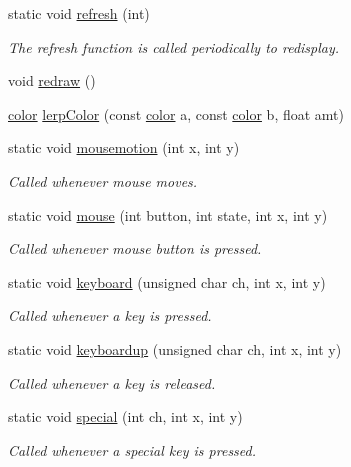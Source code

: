\begin{DoxyCompactItemize}
\item 
static void \hyperlink{namespacecprocessing_a4edceb61c45d6bf384a38826469a5a48}{refresh} (int)
\begin{DoxyCompactList}\small\item\em \-The refresh function is called periodically to redisplay. \end{DoxyCompactList}\item 
void \hyperlink{namespacecprocessing_aefce387a356aa3e4937d4e08fc1b0b4c}{redraw} ()
\item 
\hyperlink{classcprocessing_1_1color}{color} \hyperlink{namespacecprocessing_a4deeb570d9a3cb7321300200161ab054}{lerp\-Color} (const \hyperlink{classcprocessing_1_1color}{color} a, const \hyperlink{classcprocessing_1_1color}{color} b, float amt)
\item 
static void \hyperlink{namespacecprocessing_a9fc04981955baab92e7b528b6a0c7c34}{mousemotion} (int x, int y)
\begin{DoxyCompactList}\small\item\em \-Called whenever mouse moves. \end{DoxyCompactList}\item 
static void \hyperlink{namespacecprocessing_abac12fcdd0efbbd1491a14011c381241}{mouse} (int button, int state, int x, int y)
\begin{DoxyCompactList}\small\item\em \-Called whenever mouse button is pressed. \end{DoxyCompactList}\item 
static void \hyperlink{namespacecprocessing_ae6eaa821ce4703a70ab13b0420bf2573}{keyboard} (unsigned char ch, int x, int y)
\begin{DoxyCompactList}\small\item\em \-Called whenever a key is pressed. \end{DoxyCompactList}\item 
static void \hyperlink{namespacecprocessing_ae4039b15e3caa11e48cb8d63e0f08977}{keyboardup} (unsigned char ch, int x, int y)
\begin{DoxyCompactList}\small\item\em \-Called whenever a key is released. \end{DoxyCompactList}\item 
static void \hyperlink{namespacecprocessing_a1b66644ad17ec9a36ff2b304d55f4b27}{special} (int ch, int x, int y)
\begin{DoxyCompactList}\small\item\em \-Called whenever a special key is pressed. \end{DoxyCompactList}\item 

\end{DoxyCompactItemize}
